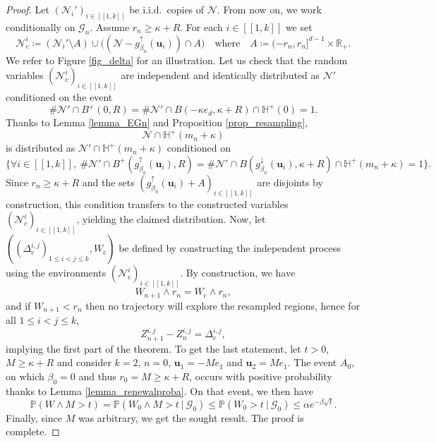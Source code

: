 \documentclass[a4paper, 11pt]{article}
\theoremstyle{plain}
\theoremstyle{definition}
\newcommand{\R}{\mathbb{R}}
\renewcommand{\P}{\mathbb{P}}
\newcommand{\range}[2]{[\![#1,#2]\!]}
\numberwithin{equation}{section}
\begin{document}
\begin{proof}
    Let $(\mathcal N_i')_{i\in\range{1}{k}}$ be i.i.d.\ copies of $\mathcal N$. From now on, we work conditionally on $\mathcal G_n$. Assume $r_n\geq\kappa+R$. For each $i\in\range{1}{k}$ we set
        \[\mathcal N_\mathrm c^i\coloneqq(\mathcal N_i'\setminus A)\cup \big((\mathcal N-g_{\beta_n}^\uparrow(\mathbf u_i))\cap A\big)\quad\text{where}\quad A\coloneqq (-r_n, r_n]^{d-1}\times\R_+.\]
    We refer to Figure \ref{fig_delta} for an illustration. Let us check that the random variables $(\mathcal N_\mathrm c^i)_{i\in\range{1}{k}}$ are independent and identically distributed as $\mathcal N'$ conditioned on the event
        \[\#\mathcal N'\cap B^+(0,R)=\#\mathcal N'\cap B(-\kappa e_d,\kappa+R)\cap\mathbb H^+(0)=1.\]
    Thanks to Lemma \ref{lemma_EGn} and Proposition \ref{prop_resampling},
        \[\mathcal N\cap\mathbb H^+(m_n+\kappa)\]
    is distributed as $\mathcal N'\cap\mathbb H^+(m_n+\kappa)$ conditioned on 
        \[\{\forall i\in\range{1}{k},~\#\mathcal N'\cap B^+(g_{\beta_n}^\uparrow(\mathbf u_i),R)=\#\mathcal N'\cap B(g_{\beta_n}^\downarrow(\mathbf u_i),\kappa+R)\cap\mathbb H^+(m_n+\kappa)=1\}.\]
    Since $r_n\geq\kappa+R$ and the sets $(g_{\beta_n}^\uparrow(\mathbf u_i)+A)_{i\in\range{1}{k}}$ are disjoints by construction, this condition transfers to the constructed variables $(\mathcal N_c^i)_{i\in\range{1}{k}}$, yielding the claimed distribution. Now, let $((\Delta^{i, j}_\mathrm c)_{1\leq i<j\leq k}, W_\mathrm c)$ be defined by constructing the independent process using the environments $(\mathcal N_\mathrm c^i)_{i\in\range{1}{k}}$. By construction, we have
        \[W_{n+1}\wedge r_n=W_\mathrm c\wedge r_n,\]
    and if $W_{n+1}<r_n$ then no trajectory will explore the resampled regions, hence for all $1\leq i<j\leq k$,
        \[Z_{n+1}^{i, j}-Z_n^{i, j}=\Delta^{i, j}_\mathrm c,\]
    implying the first part of the theorem. To get the last statement, let $t>0$,  $M\geq\kappa+R$ and consider $k=2$, $n=0$, $\mathbf u_1=-Me_1$ and $\mathbf u_2=Me_1$. The event $A_0$, on which $\beta_0=0$ and thus $r_0=M\geq\kappa+R$, occurs with positive probability thanks to Lemma \ref{lemma_renewalproba}. On that event, we then have
       \begin{equation*}
           \P(W\wedge M>t)=\P(W_0\wedge M>t~|~\mathcal G_0)\leq\P(W_0>t~|~\mathcal G_0)\leq\alpha e^{-\beta\sqrt t}.
       \end{equation*}
   Finally, since $M$ was arbitrary, we get the sought result. The proof is complete.
\end{proof}
\end{document}
